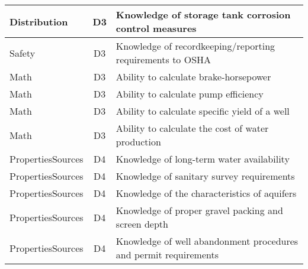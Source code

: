 \documentclass{article}
\begin{document}
\begin{table}[]
\begin{tabular}{|l|c|l|}
Distribution                           & D3             & Knowledge of storage   tank corrosion control measures                                                                            \\ \hline
Safety                                 & D3             & Knowledge of   recordkeeping/reporting requirements to OSHA                                                                       \\ \hline
Math                                   & D3             & Ability to calculate   brake-horsepower                                                                                           \\ \hline
Math                                   & D3             & Ability to calculate   pump efficiency                                                                                            \\ \hline
Math                                   & D3             & Ability to calculate   specific yield of a well                                                                                   \\ \hline
Math                                   & D3             & Ability to calculate   the cost of water production                                                                               \\ \hline
PropertiesSources                      & D4             & Knowledge of long-term water availability                                                                                         \\ \hline
PropertiesSources                      & D4             & Knowledge of sanitary survey requirements                                                                                         \\ \hline
PropertiesSources                      & D4             & Knowledge of the characteristics of   aquifers                                                                                    \\ \hline
PropertiesSources                      & D4             & Knowledge of proper gravel packing and   screen depth                                                                             \\ \hline
PropertiesSources                      & D4             & Knowledge of well abandonment procedures and   permit requirements                                                                \\ \hline

\end{tabular}
\end{table}
\end{document}
